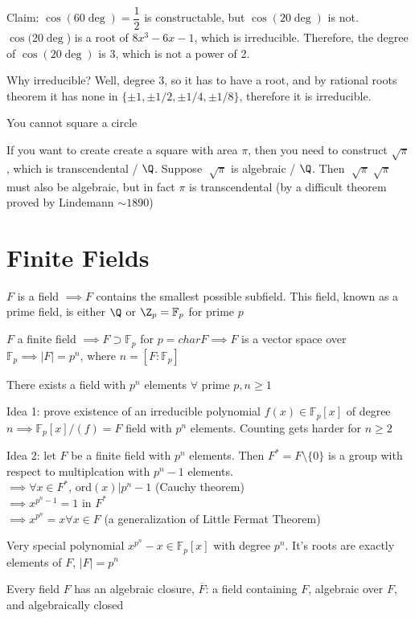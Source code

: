 \documentclass[twoside, 10pt]{article}
\newcommand{\F}{\mathbb{F}}
\begin{document}
Claim: $\cos(60 \deg) = \dfrac{1}{2}$ is constructable, but $\cos(20\deg)$ is not. $\cos(20 \deg$) is a root of $8x^3 - 6x - 1$, which is irreducible. Therefore, the degree of $\cos(20\deg)$ is 3, which is not a power of 2.

Why irreducible? Well, degree 3, so it has to have a root, and by rational roots theorem it has none in $\{\pm1, \pm 1/2, \pm 1/4, \pm 1/8\}$, therefore it is irreducible.

\begin{cor}
    You cannot square a circle
\end{cor}
If you want to create create a square with area $\pi$, then you need to construct $\sqrt{\pi}$, which is transcendental / $\Q$. Suppose $\sqrt[]{\pi}$ is algebraic / $\Q$. Then $\sqrt[]{\pi} \sqrt[]{\pi}$ must also be algebraic, but in fact $\pi$ is transcendental (by a difficult theorem proved by Lindemann $\sim1890$)

\section{Finite Fields}
$F$ is a field $\implies F$ contains the smallest possible subfield. This field, known as a prime field, is either $\Q$ or $\Z_p = \F_p$ for prime $p$

$F$ a finite field $\implies F \supset \F_p$ for $p = char F \implies F$ is a vector space over $\F_p \implies |F| = p^n$, where $n = [F: \F_p]$

\begin{thm}
    There exists a field with $p^n$ elements $\forall$ prime $p, n \geq 1$
\end{thm}
Idea 1: prove existence of an irreducible polynomial $f(x) \in \F_p[x]$ of degree $n \implies \F_p[x]/(f) = F$ field with $p^n$ elements. Counting gets harder for $n \geq 2$

Idea 2: let $F$ be a finite field with $p^n$ elements. Then $F^* = F\setminus\{0\}$ is a group with respect to multiplcation with $p^n - 1$ elements.\\
$\implies \forall x \in F^*$, ord$(x) | p^n - 1$ (Cauchy theorem)\\
$\implies x^{p^n - 1} = 1$ in $F^*$\\
$\implies x^{p^n} = x \forall x \in F$ (a generalization of Little Fermat Theorem)

Very special polynomial $x^{p^n} - x \in \F_p[x]$ with degree $p^n$. It's roots are exactly elements of $F$, $|F| = p^n$

\begin{thm}
    Every field $F$ has an algebraic closure, $\overline{F}$: a field containing $F$, algebraic over $F$, and algebraically closed
\end{thm}
\end{document}
